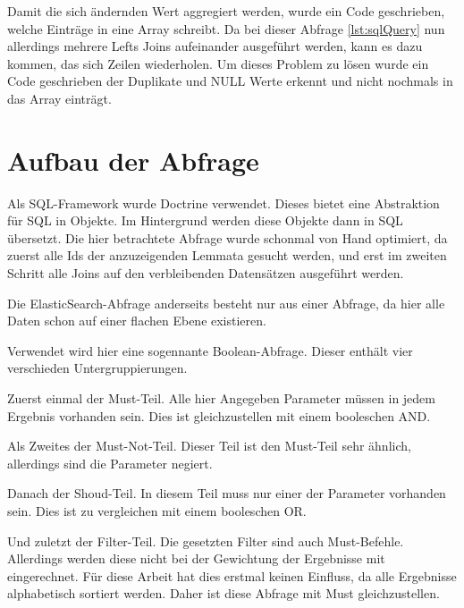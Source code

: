 Damit die sich ändernden Wert aggregiert werden, wurde ein Code geschrieben, welche Einträge in eine Array schreibt. Da bei dieser Abfrage \ref{lst:sqlQuery} nun allerdings mehrere Lefts Joins aufeinander ausgeführt werden, kann es dazu kommen, das sich Zeilen wiederholen. Um dieses Problem zu lösen wurde ein Code geschrieben der Duplikate und NULL Werte erkennt und nicht nochmals in das Array einträgt.

\section{Aufbau der Abfrage}

Als SQL-Framework wurde Doctrine verwendet. Dieses bietet eine Abstraktion für SQL in Objekte. Im Hintergrund werden diese Objekte dann in SQL übersetzt. Die hier betrachtete Abfrage wurde schonmal von Hand optimiert, da zuerst alle Ids der anzuzeigenden Lemmata gesucht werden, und erst im zweiten Schritt alle Joins auf den verbleibenden Datensätzen ausgeführt werden.

Die ElasticSearch-Abfrage anderseits besteht nur aus einer Abfrage, da hier alle Daten schon auf einer flachen Ebene existieren.

Verwendet wird hier eine sogennante Boolean-Abfrage. Dieser enthält vier verschieden Untergruppierungen.

Zuerst einmal der Must-Teil. Alle hier Angegeben Parameter müssen in jedem Ergebnis vorhanden sein. Dies ist gleichzustellen mit einem booleschen AND. 

Als Zweites der Must-Not-Teil. Dieser Teil ist den Must-Teil sehr ähnlich, allerdings sind die Parameter negiert.

Danach der Shoud-Teil. In diesem Teil muss nur einer der Parameter vorhanden sein. Dies ist zu vergleichen mit einem booleschen OR. 

Und zuletzt der Filter-Teil. Die gesetzten Filter sind auch Must-Befehle. Allerdings werden diese nicht bei der Gewichtung der Ergebnisse mit eingerechnet. Für diese Arbeit hat dies erstmal keinen Einfluss, da alle Ergebnisse alphabetisch sortiert werden. Daher ist diese Abfrage mit Must gleichzustellen. \cite{ElasticsearchB.V..17.12.2019}



